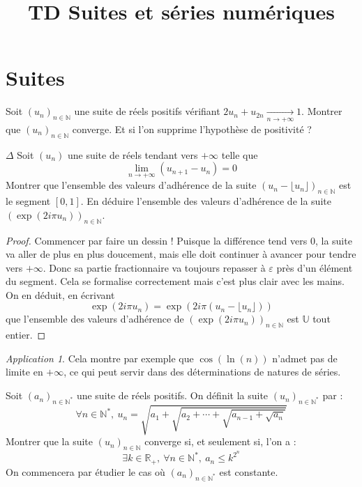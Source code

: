 \documentclass[french,a4paper]{article}
\title{TD Suites et séries numériques}
\newcommand{\N}{\mathbb{N}}
\newcommand{\R}{\mathbb{R}}
\newcommand{\U}{\mathbb{U}}
\newcommand{\st}{^*}
\theoremstyle{plain}
\theoremstyle{definition}
\theoremstyle{remark}
\newtheorem*{app}{Application}
\begin{document}
\maketitle

\section{Suites}

\begin{ex}{}
	Soit $(u_n)_{n\in\N}$ une suite de réels positifs vérifiant $2u_n+u_{2n}\xrightarrow[n\to+\infty]{}1$. Montrer que $(u_n)_{n\in\N}$ converge. Et si l'on supprime l'hypothèse de positivité ?
\end{ex}

\begin{ex}{$\Delta$}
	Soit $(u_n)$ une suite de réels tendant vers $+\infty$ telle que $$\lim_{n\to+\infty}(u_{n+1}-u_n)=0$$ Montrer que l'ensemble des valeurs d'adhérence de la suite $(u_n-\lfloor u_n\rfloor)_{n\in\N}$ est le segment $[0,1]$. En déduire l'ensemble des valeurs d'adhérence de la suite $\left(\exp(2i\pi u_n)\right)_{n\in\N}$.
\end{ex}

\begin{proof}
	Commencer par faire un dessin ! Puisque la différence tend vers $0$, la suite va aller de plus en plus doucement, mais elle doit continuer à avancer pour tendre vers $+\infty$. Donc sa partie fractionnaire va toujours repasser à $\varepsilon$ près d'un élément du segment. Cela se formalise correctement mais c'est plus clair avec les mains. On en déduit, en écrivant $$\exp(2i\pi u_n)=\exp(2i\pi (u_n-\lfloor u_n\rfloor))$$ que l'ensemble des valeurs d'adhérence de $\left(\exp(2i\pi u_n)\right)_{n\in\N}$ est $\U$ tout entier.
\end{proof}

\begin{app}
	Cela montre par exemple que $\cos(\ln(n))$ n'admet pas de limite en $+\infty$, ce qui peut servir dans des déterminations de natures de séries.
\end{app}

\begin{ex}{}
	Soit $(a_n)_{n\in\N\st}$ une suite de réels positifs. On définit la suite $(u_n)_{n\in\N\st}$ par : $$\forall n\in\N\st,\ u_n=\displaystyle\sqrt{a_1+\sqrt{a_2+\cdots+\sqrt{a_{n-1}+\sqrt{a_n}}}}$$ Montrer que la suite $(u_n)_{n\in\N}$ converge si, et seulement si, l'on a : $$\exists k\in\R_+,\ \forall n\in\N\st,\ a_n\leqslant k^{2^n}$$ On commencera par étudier le cas où $(a_n)_{n\in\N\st}$ est constante.
\end{ex}
\end{document}

